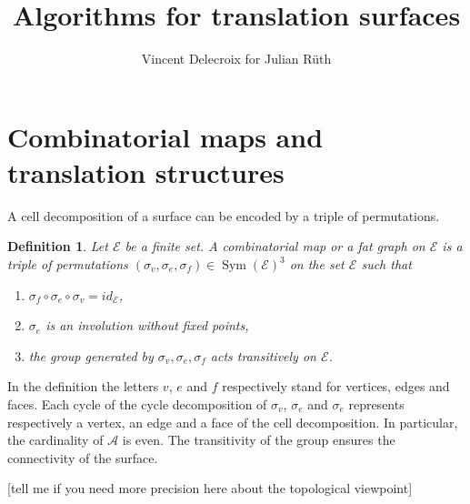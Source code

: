 \documentclass{article}
\title{Algorithms for translation surfaces}
\author{Vincent Delecroix for Julian R\"uth}
\def\cA{\mathcal{A}}
\def\cE{\mathcal{E}}
\def\Sym{\operatorname{Sym}}
\newtheorem{definition}{Definition}
\newcommand{\commv}[1]{{\color{red!50!gray}[#1]}}
\begin{document}
\maketitle

\section{Combinatorial maps and translation structures}
\label{sec:TriangulationsAndTranslationStructures}

A cell decomposition of a surface can be encoded by a triple of
permutations.
\begin{definition}
Let $\cE$ be a finite set.
A \emph{combinatorial map} or a \emph{fat graph} on $\cE$ is a triple
of permutations $(\sigma_v, \sigma_e, \sigma_f) \in \Sym(\cE)^3$ on
the set $\cE$ such that
\begin{enumerate}
\item $\sigma_f \circ \sigma_e \circ \sigma_v = id_\cE$,
\item $\sigma_e$ is an involution without fixed points,
\item the group generated by $\sigma_v, \sigma_e, \sigma_f$ acts transitively on $\cE$.
\end{enumerate}
\end{definition}
In the definition the letters  $v$, $e$ and $f$ respectively stand for vertices, edges
and faces.  Each cycle of the cycle decomposition of $\sigma_v$, $\sigma_e$
and $\sigma_e$ represents respectively a vertex, an edge
and a face of the cell decomposition. In particular, the cardinality of $\cA$
is even. The transitivity of the group ensures the connectivity of the surface.

\commv{tell me if you need more precision here about the topological viewpoint}
\end{document}
